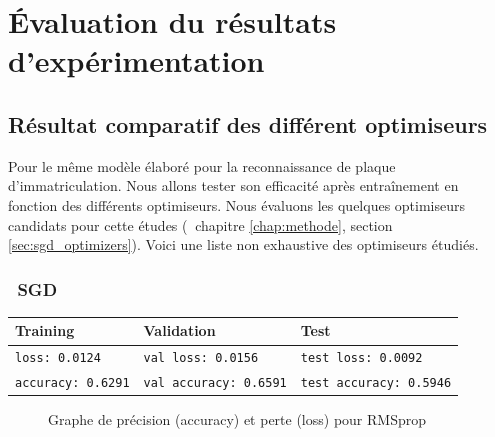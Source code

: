 \section{Évaluation du  résultats d'expérimentation}

	\subsection{Résultat comparatif des différent optimiseurs} \label{sec:result_optimizer}	

	Pour le même modèle élaboré pour la reconnaissance de plaque d'immatriculation. Nous allons tester son efficacité après entraînement en fonction des différents optimiseurs. Nous évaluons les quelques optimiseurs candidats pour cette études  (\cf $ \ $ chapitre \ref{chap:methode}, section \ref{sec:sgd_optimizers}). Voici une liste non exhaustive des optimiseurs étudiés.
	\subsubsection*{\qquad \textbullet \ SGD }
		\begin{table}[H]
			\centering
			\begin{tabular}{l|l|l}
				\hline
				\textbf{Training} & \textbf{Validation} & \textbf{Test} \\
				\hline
				
				\texttt{loss: 0.0124} & \texttt{val loss: 0.0156} & \texttt{test loss: 0.0092} \\
				\texttt{accuracy: 0.6291} & \texttt{val accuracy: 0.6591} & \texttt{test accuracy: 0.5946} \\
				
				\hline
				
			\end{tabular}
		\end{table}
	
		\begin{figure}[H]
			\myfloatalign
			 \quad
			
			\caption[]{Graphe de précision (accuracy) et perte (loss)  pour RMSprop}
		\end{figure}
